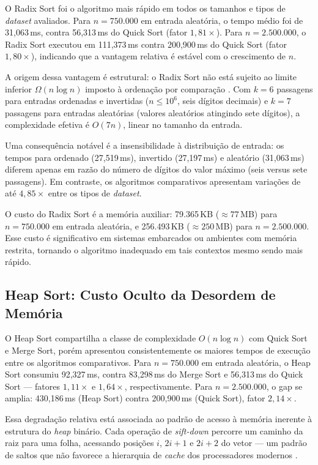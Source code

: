 \documentclass[12pt]{article}
\newcommand{\num}[1]{#1}
\begin{document}
O Radix Sort foi o algoritmo mais rápido em todos os tamanhos
e tipos de \textit{dataset} avaliados. Para $n = 750.000$ em
entrada aleatória, o tempo médio foi de 31,063\,ms, contra
56,313\,ms do Quick Sort (fator $1{,}81\times$). Para
$n = 2.500.000$, o Radix Sort executou em 111,373\,ms contra
200,900\,ms do Quick Sort (fator $1{,}80\times$), indicando
que a vantagem relativa é estável com o crescimento de $n$.

A origem dessa vantagem é estrutural: o Radix Sort não está
sujeito ao limite inferior $\Omega(n \log n)$ imposto à ordenação
por comparação \cite{cormen2009}. Com $k = 6$ passagens para
entradas ordenadas e invertidas ($n \leq 10^6$, seis dígitos
decimais) e $k = 7$ passagens para entradas aleatórias (valores
aleatórios atingindo sete dígitos), a complexidade efetiva é
$O(7n)$, linear no tamanho da entrada.

Uma consequência notável é a insensibilidade à distribuição de entrada:
os tempos para ordenado (27,519\,ms), invertido (27,197\,ms) e
aleatório (31,063\,ms) diferem apenas em razão do número de dígitos
do valor máximo (seis versus sete passagens). Em contraste, os
algoritmos comparativos apresentam variações de até $4{,}85\times$
entre os tipos de \textit{dataset}.

O custo do Radix Sort é a memória auxiliar: \num{79.365}\,KB
($\approx 77$\,MB) para $n = 750.000$ em entrada aleatória, e
\num{256.493}\,KB ($\approx 250$\,MB) para $n = 2.500.000$.
Esse custo é significativo em sistemas embarcados ou ambientes com
memória restrita, tornando o algoritmo inadequado em tais contextos
mesmo sendo mais rápido.

\subsection{Heap Sort: Custo Oculto da Desordem de Memória}

O Heap Sort compartilha a classe de complexidade $O(n \log n)$ com
Quick Sort e Merge Sort, porém apresentou consistentemente os maiores
tempos de execução entre os algoritmos comparativos. Para
$n = 750.000$ em entrada aleatória, o Heap Sort consumiu 92,327\,ms,
contra 83,298\,ms do Merge Sort e 56,313\,ms do Quick Sort ---
fatores $1{,}11\times$ e $1{,}64\times$, respectivamente. Para
$n = 2.500.000$, o gap se amplia: 430,186\,ms (Heap Sort) contra
200,900\,ms (Quick Sort), fator $2{,}14\times$.

Essa degradação relativa está associada ao padrão de acesso à
memória inerente à estrutura do \textit{heap} binário. Cada operação
de \textit{sift-down} percorre um caminho da raiz para uma folha,
acessando posições $i$, $2i+1$ e $2i+2$ do vetor --- um padrão de
saltos que não favorece a hierarquia de \textit{cache} dos
processadores modernos \cite{biggar2008}.
\end{document}
